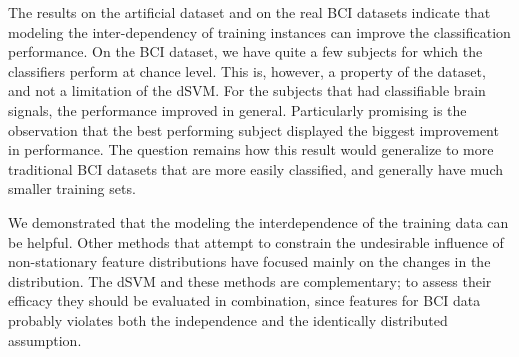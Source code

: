 The results on the artificial dataset and on the real \ac{BCI} datasets
indicate that modeling the inter-dependency of training instances can improve
the classification performance. On the \ac{BCI} dataset, we have quite a few
subjects for which the classifiers perform at chance level. This is, however, a
property of the dataset, and not a limitation of the \ac{dSVM}. 
%
For the subjects that had classifiable brain signals, the performance improved
in general. Particularly promising is the observation that the best performing
subject displayed the biggest improvement in performance. The question
remains how this result would generalize to more traditional \ac{BCI} datasets
that are more easily classified, and generally have much smaller training sets.
 
We demonstrated that the modeling the interdependence of the training data can
be helpful. Other methods that attempt to constrain the undesirable influence of
non-stationary feature distributions have focused mainly on the changes in the
distribution. The \ac{dSVM} and these methods are complementary; to assess
their efficacy they should be evaluated in combination, since features for
\ac{BCI} data probably violates both the independence and the identically
distributed assumption.

